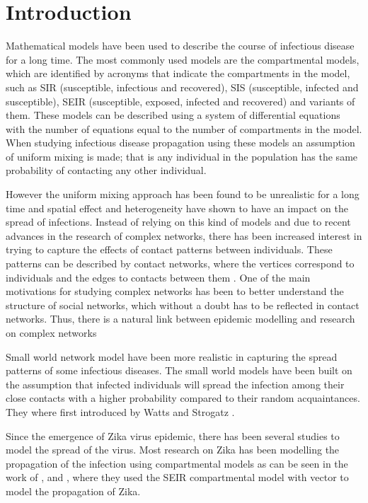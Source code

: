 \chapter{Introduction}
Mathematical models have been used to describe the course of infectious disease for a long time. The most commonly used
models are the compartmental models, which are identified by acronyms that indicate the compartments in the model, such as SIR (susceptible, infectious and recovered), SIS (susceptible, infected and susceptible),
SEIR  (susceptible, exposed, infected and recovered) and variants of them. These models can be described using a system of differential equations with the number of equations equal to the number of compartments in the model.
When studying infectious disease propagation using these models an assumption of uniform mixing is made; that is any individual in the population has the same probability of contacting any other individual.
 
However the uniform mixing approach has been found to be unrealistic for a long time
and spatial effect and heterogeneity have shown to have an impact on the spread of infections. Instead of relying on this kind of models and due to recent advances in the research of complex networks, there has been increased interest in trying to capture the effects of contact patterns between individuals. These patterns can be described by contact networks, where the vertices correspond to individuals and the edges to contacts between them  \citep{wallinga1999perspective}. One of the main motivations for studying complex networks has been to better understand the structure of social networks, which without a doubt has to be reflected in contact networks. Thus, there is a natural link between epidemic modelling and research on complex networks \citep{kaski2005modeling}
 
Small world network  model have been more realistic in capturing the spread patterns of some infectious diseases. The small world models have been built on the assumption that infected individuals will spread the infection among their close contacts with a higher probability compared to their random acquaintances. They where first introduced by Watts and Strogatz \citep{watts1998collective}.
 
Since the emergence of Zika virus epidemic, there has been several studies to model the spread of the virus. Most research on Zika has been modelling the propagation of the infection
using compartmental models as can be seen in the work of \cite{1}, \cite{2} and \cite{3}, where they used the SEIR compartmental model with vector to model the propagation of Zika. 

